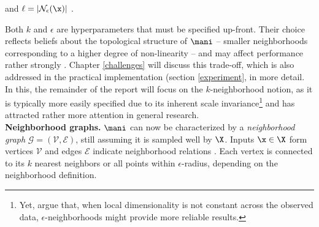 and $\ell = |\mathcal{N}_{\epsilon} (\x)|$ \citep{heetal2005}.

Both $k$ and $\epsilon$ are hyperparameters that must be specified up-front.
Their choice reflects beliefs about the topological structure of $\mani$ -- 
smaller neighborhoods corresponding to a higher degree of non-linearity -- and 
may affect performance rather strongly \citep{sudderth2002}.
Chapter \ref{challenges} will discuss this trade-off, which is also addressed in 
the practical implementation (section \ref{experiment}, in more detail.
In this, the remainder of the report will focus on the $k$-neighborhood notion, 
as it is typically more easily specified due to its inherent scale invariance\footnote{
Yet, \citet{tenenbaumdesilva2000} argue that, when local dimensionality 
is not constant across the observed data, $\epsilon$-neighborhoods might provide 
more reliable results.
} and has 
attracted rather more attention in general research. 
\\

\textbf{Neighborhood graphs.}
$\mani$ can now be characterized by a \textit{neighborhood 
graph} $\mathcal{G} = (\mathcal{V}, \mathcal{E})$, still assuming it is 
sampled well by $\X$. 
Inputs $\x \in \X$ form vertices $\mathcal{V}$ and edges $\mathcal{E}$ 
indicate neighborhood relations \citep{belkinniyogi2001}.
Each vertex is connected to its $k$ nearest neighbors or all points 
within $\epsilon$-radius, depending on the neighborhood definition.

